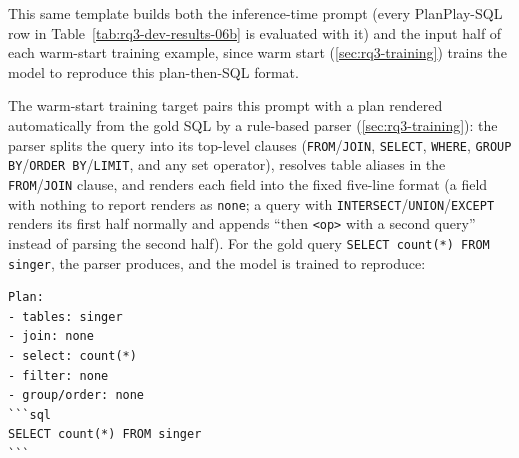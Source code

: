 \documentclass[11pt]{article}
\begin{document}
This same template builds both the inference-time prompt (every PlanPlay-SQL row in Table~\ref{tab:rq3-dev-results-06b} is evaluated with it) and the input half of each warm-start training example, since warm start (\ref{sec:rq3-training}) trains the model to reproduce this plan-then-SQL format.

The warm-start training target pairs this prompt with a plan rendered automatically from the gold SQL by a rule-based parser (\ref{sec:rq3-training}): the parser splits the query into its top-level clauses (\texttt{FROM}/\texttt{JOIN}, \texttt{SELECT}, \texttt{WHERE}, \texttt{GROUP BY}/\texttt{ORDER BY}/\texttt{LIMIT}, and any set operator), resolves table aliases in the \texttt{FROM}/\texttt{JOIN} clause, and renders each field into the fixed five-line format (a field with nothing to report renders as \texttt{none}; a query with \texttt{INTERSECT}/\texttt{UNION}/\texttt{EXCEPT} renders its first half normally and appends ``then \texttt{<op>} with a second query'' instead of parsing the second half). For the gold query \texttt{SELECT count(*) FROM singer}, the parser produces, and the model is trained to reproduce:

\begin{verbatim}
Plan:
- tables: singer
- join: none
- select: count(*)
- filter: none
- group/order: none
```sql
SELECT count(*) FROM singer
```
\end{verbatim}
\end{document}
